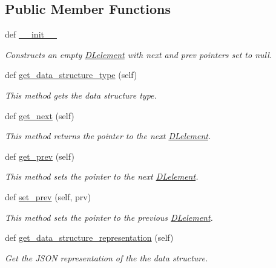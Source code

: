 \subsection*{Public Member Functions}
\begin{DoxyCompactItemize}
\item 
def \hyperlink{class_d_lelement_1_1_d_lelement_a37c6c1e1d648f1b8ebf44fe78e123b14}{\+\_\+\+\_\+init\+\_\+\+\_\+}
\begin{DoxyCompactList}\small\item\em Constructs an empty \hyperlink{class_d_lelement_1_1_d_lelement}{D\+Lelement} with next and prev pointers set to null. \end{DoxyCompactList}\item 
def \hyperlink{class_d_lelement_1_1_d_lelement_a9619e5ea68979dcfcc2c40e774d499d3}{get\+\_\+data\+\_\+structure\+\_\+type} (self)
\begin{DoxyCompactList}\small\item\em This method gets the data structure type. \end{DoxyCompactList}\item 
def \hyperlink{class_d_lelement_1_1_d_lelement_abd2d460265d1d725e28f761c1c400ad3}{get\+\_\+next} (self)
\begin{DoxyCompactList}\small\item\em This method returns the pointer to the next \hyperlink{class_d_lelement_1_1_d_lelement}{D\+Lelement}. \end{DoxyCompactList}\item 
def \hyperlink{class_d_lelement_1_1_d_lelement_a6c19acc6eb47b67862562fbc377a34f3}{get\+\_\+prev} (self)
\begin{DoxyCompactList}\small\item\em This method sets the pointer to the next \hyperlink{class_d_lelement_1_1_d_lelement}{D\+Lelement}. \end{DoxyCompactList}\item 
def \hyperlink{class_d_lelement_1_1_d_lelement_a8bd21c2b836357ef4b0f25444247f1e3}{set\+\_\+prev} (self, prv)
\begin{DoxyCompactList}\small\item\em This method sets the pointer to the previous \hyperlink{class_d_lelement_1_1_d_lelement}{D\+Lelement}. \end{DoxyCompactList}\item 
def \hyperlink{class_d_lelement_1_1_d_lelement_a2767441ba9442e88b64ba3c6a18adc8c}{get\+\_\+data\+\_\+structure\+\_\+representation} (self)
\begin{DoxyCompactList}\small\item\em Get the J\+S\+O\+N representation of the the data structure. \end{DoxyCompactList}\end{DoxyCompactItemize}
